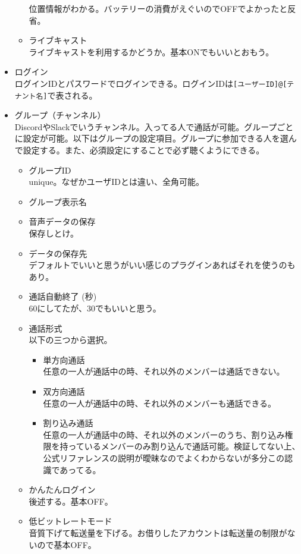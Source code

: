 \documentclass[dvipdfmx,jb5]{jarticle}
\begin{document}
\begin{itemize}
\begin{itemize}
  位置情報がわかる。バッテリーの消費がえぐいのでOFFでよかったと反省。
  \item ライブキャスト\\
  ライブキャストを利用するかどうか。基本ONでもいいとおもう。
\end{itemize}
\item ログイン\\
ログインIDとパスワードでログインできる。ログインIDは\verb|[ユーザーID]@[テナント名]|で表される。
\item グループ（チャンネル）\\
DiscordやSlackでいうチャンネル。入ってる人で通話が可能。グループごとに設定が可能。以下はグループの設定項目。グループに参加できる人を選んで設定する。また、必須設定にすることで必ず聴くようにできる。
\begin{itemize}
\item グループID\\
unique。なぜかユーザIDとは違い、全角可能。
\item グループ表示名
\item 音声データの保存\\
保存しとけ。
\item データの保存先\\
デフォルトでいいと思うがいい感じのプラグインあればそれを使うのもあり。
\item 通話自動終了 (秒)\\
60にしてたが、30でもいいと思う。
\item 通話形式\\
以下の三つから選択。
\begin{itemize}
\item 単方向通話\\
任意の一人が通話中の時、それ以外のメンバーは通話できない。
\item 双方向通話\\
任意の一人が通話中の時、それ以外のメンバーも通話できる。
\item 割り込み通話\\
任意の一人が通話中の時、それ以外のメンバーのうち、割り込み権限を持っているメンバーのみ割り込んで通話可能。検証してない上、公式リファレンスの説明が曖昧なのでよくわからないが多分この認識であってる。
\end{itemize}
\item かんたんログイン\\
後述する。基本OFF。
\item 低ビットレートモード\\
音質下げて転送量を下げる。お借りしたアカウントは転送量の制限がないので基本OFF。

\end{itemize}
\end{itemize}
\end{document}
